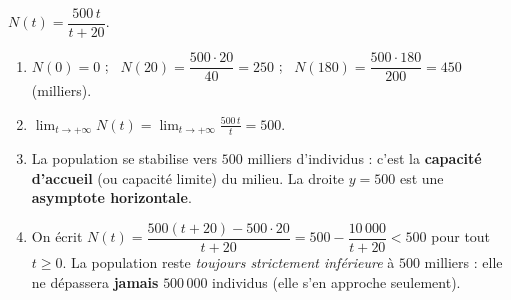 \documentclass[11pt,a4paper]{article}
\begin{document}
\begin{correction}
$N(t)=\dfrac{500\,t}{t+20}$.
\begin{enumerate}[label=\alph*),leftmargin=2em,itemsep=3pt]
  \item $N(0)=0$ ; \ $N(20)=\dfrac{500\cdot 20}{40}=250$ ; \ $N(180)=\dfrac{500\cdot 180}{200}=450$ (milliers).
  \item $\displaystyle\lim_{t\to+\infty} N(t)=\lim_{t\to+\infty}\frac{500\,t}{t}=500$.
  \item La population se stabilise vers $500$ milliers d'individus : c'est la \textbf{capacité d'accueil}
        (ou capacité limite) du milieu. La droite $y=500$ est une \textbf{asymptote horizontale}.
  \item On écrit $N(t)=\dfrac{500(t+20)-500\cdot 20}{t+20}=500-\dfrac{10\,000}{t+20}<500$ pour tout $t\geq 0$.
        La population reste \emph{toujours strictement inférieure} à $500$ milliers : elle ne dépassera
        \textbf{jamais} $500\,000$ individus (elle s'en approche seulement).
\end{enumerate}
\end{correction}
\end{document}
